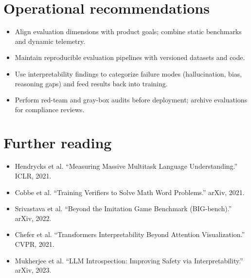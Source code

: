 \documentclass{article}
\begin{document}
\section*{Operational recommendations}
\begin{itemize}
  \item Align evaluation dimensions with product goals; combine static benchmarks and dynamic telemetry.
  \item Maintain reproducible evaluation pipelines with versioned datasets and code.
  \item Use interpretability findings to categorize failure modes (hallucination, bias, reasoning gaps) and feed results back into training.
  \item Perform red-team and gray-box audits before deployment; archive evaluations for compliance reviews.
\end{itemize}

\section*{Further reading}
\begin{itemize}
  \item Hendrycks et al. ``Measuring Massive Multitask Language Understanding.'' ICLR, 2021.
  \item Cobbe et al. ``Training Verifiers to Solve Math Word Problems.'' arXiv, 2021.
  \item Srivastava et al. ``Beyond the Imitation Game Benchmark (BIG-bench).'' arXiv, 2022.
  \item Chefer et al. ``Transformers Interpretability Beyond Attention Visualization.'' CVPR, 2021.
  \item Mukherjee et al. ``LLM Introspection: Improving Safety via Interpretability.'' arXiv, 2023.
\end{itemize}
\end{document}
